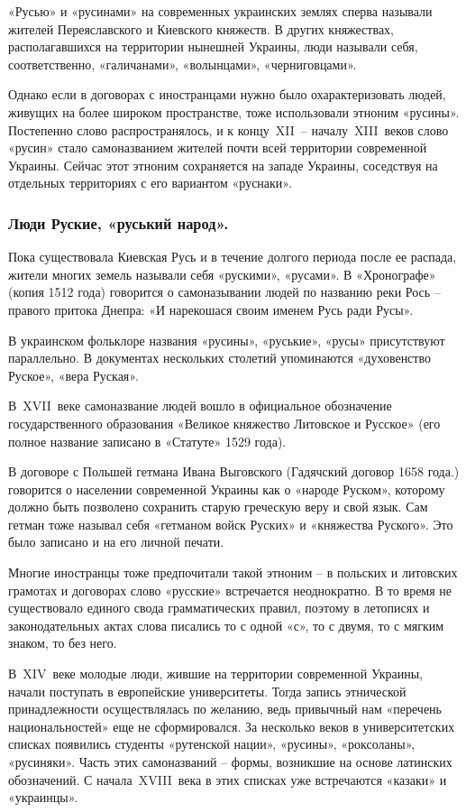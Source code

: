 «Русью» и «русинами» на современных украинских землях сперва называли
жителей Переяславского и Киевского княжеств. В других княжествах,
располагавшихся на территории нынешней Украины, люди называли себя,
соответственно, «галичанами», «волынцами», «черниговцами».

Однако если в договорах с иностранцами нужно было охарактеризовать людей,
живущих на более широком пространстве, тоже использовали этноним «русины».
Постепенно слово распространялось, и к концу XII – началу XIII веков слово
«русин» стало самоназванием жителей почти всей территории современной
Украины. Сейчас этот этноним сохраняется на западе Украины, соседствуя на
отдельных территориях с его вариантом «руснаки».

\subsubsection{Люди Руские, «руський народ».}

Пока существовала Киевская Русь и в течение долгого периода после ее
распада, жители многих земель называли себя «рускими», «русами». В
«Хронографе» (копия 1512 года) говорится о самоназывании людей по названию
реки Рось – правого притока Днепра: «И нарекошася своим именем Русь ради
Русы».

В украинском фольклоре названия «русины», «руськие», «русы» присутствуют
параллельно. В документах нескольких столетий упоминаются «духовенство
Руское», «вера Руская».

В XVII веке самоназвание людей вошло в официальное обозначение
государственного образования «Великое княжество Литовское и Русское» (его
полное название записано в «Статуте» 1529 года).

В договоре с Польшей гетмана Ивана Выговского (Гадячский договор 1658
года.) говорится о населении современной Украины как о «народе Руском»,
которому должно быть позволено сохранить старую греческую веру и свой
язык. Сам гетман тоже называл себя «гетманом войск Руских» и «княжества
Руского». Это было записано и на его личной печати.

Многие иностранцы тоже предпочитали такой этноним – в польских и литовских
грамотах и договорах слово «русские» встречается неоднократно. В то время
не существовало единого свода грамматических правил, поэтому в летописях и
законодательных актах слова писались то с одной «с», то с двумя, то с
мягким знаком, то без него.

В XIV веке молодые люди, жившие на территории современной Украины, начали
поступать в европейские университеты. Тогда запись этнической
принадлежности осуществлялась по желанию, ведь привычный нам «перечень
национальностей» еще не сформировался. За несколько веков в
университетских списках появились студенты «рутенской нации», «русины»,
«роксоланы», «русиняки». Часть этих самоназваний – формы, возникшие на
основе латинских обозначений. С начала XVIII века в этих списках уже
встречаются «казаки» и «украинцы».

